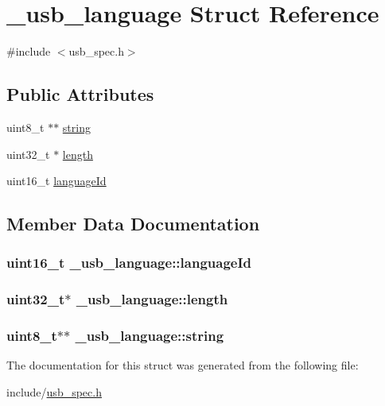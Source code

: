 \hypertarget{struct__usb__language}{\section{\-\_\-usb\-\_\-language Struct Reference}
\label{struct__usb__language}
}


{\ttfamily \#include $<$usb\-\_\-spec.\-h$>$}

\subsection*{Public Attributes}
\begin{DoxyCompactItemize}
\item 
uint8\-\_\-t $\ast$$\ast$ \hyperlink{struct__usb__language_abc4c65615dd851be7811baa67c808052}{string}
\item 
uint32\-\_\-t $\ast$ \hyperlink{struct__usb__language_a17782635c4abf9f92a2259ae733d3127}{length}
\item 
uint16\-\_\-t \hyperlink{struct__usb__language_ab2bd26bc9e3514d944a120ff9e3a4dd9}{language\-Id}
\end{DoxyCompactItemize}


\subsection{Member Data Documentation}
\hypertarget{struct__usb__language_ab2bd26bc9e3514d944a120ff9e3a4dd9}{
\subsubsection[{language\-Id}]{\setlength{\rightskip}{0pt plus 5cm}uint16\-\_\-t \-\_\-usb\-\_\-language\-::language\-Id}}\label{struct__usb__language_ab2bd26bc9e3514d944a120ff9e3a4dd9}
\hypertarget{struct__usb__language_a17782635c4abf9f92a2259ae733d3127}{
\subsubsection[{length}]{\setlength{\rightskip}{0pt plus 5cm}uint32\-\_\-t$\ast$ \-\_\-usb\-\_\-language\-::length}}\label{struct__usb__language_a17782635c4abf9f92a2259ae733d3127}
\hypertarget{struct__usb__language_abc4c65615dd851be7811baa67c808052}{
\subsubsection[{string}]{\setlength{\rightskip}{0pt plus 5cm}uint8\-\_\-t$\ast$$\ast$ \-\_\-usb\-\_\-language\-::string}}\label{struct__usb__language_abc4c65615dd851be7811baa67c808052}


The documentation for this struct was generated from the following file\-:\begin{DoxyCompactItemize}
\item 
include/\hyperlink{usb__spec_8h}{usb\-\_\-spec.\-h}\end{DoxyCompactItemize}
